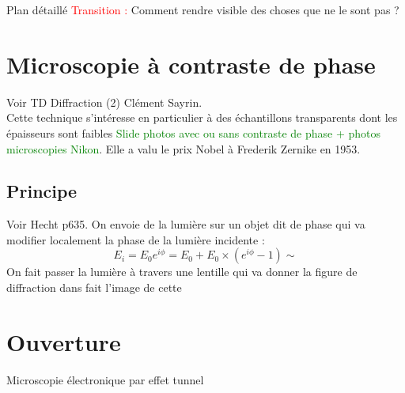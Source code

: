 \begin{reportBlock}{Plan détaillé}
  \textcolor{red}{Transition :} Comment rendre visible des choses que ne le sont pas ?
  
\section{Microscopie à contraste de phase}
Voir TD Diffraction (2) Clément Sayrin.\\
Cette technique s'intéresse en particulier à des échantillons transparents dont les épaisseurs sont faibles \textcolor{green}{Slide photos avec ou sans contraste de phase + photos microscopies Nikon}. Elle a valu le prix Nobel à Frederik Zernike en 1953.
\subsection{Principe}
Voir Hecht p635. On envoie de la lumière sur un objet dit de phase qui va modifier localement la phase de la lumière incidente :
\begin{equation}
    E_i = E_0e^{i\phi} = E_0 + E_0\times(e^{i\phi}-1) \sim 
\end{equation}
On fait passer la lumière à travers une lentille qui va donner la figure de diffraction dans fait l'image de cette 


\section*{Ouverture}
Microscopie électronique par effet tunnel

\end{reportBlock}